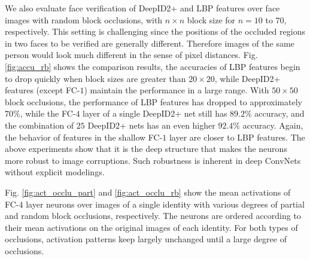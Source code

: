 \documentclass[10pt,twocolumn,letterpaper]{article}
\begin{document}
We also evaluate face verification of DeepID2+ and LBP features over face images with random block occlusions, with $n\times n$ block size for $n=10$ to $70$, respectively. This setting is challenging since the positions of the occluded regions in two faces to be verified are generally different. Therefore images of the same person would look much different in the sense of pixel distances. Fig. \ref{fig:accu_rb} shows the comparison results, the accuracies of LBP features begin to drop quickly when block sizes are greater than $20\times20$, while DeepID2+ features (except FC-$1$) maintain the performance in a large range. With $50\times50$ block occlusions, the performance of LBP features has dropped to approximately $70\%$, while the FC-$4$ layer of a single DeepID2+ net still has $89.2\%$ accuracy, and the combination of $25$ DeepID2+ nets has an even higher $92.4\%$ accuracy. Again, the behavior of features in the shallow FC-$1$ layer are closer to LBP features. The above experiments show that it is the deep structure that makes the neurons more robust to image corruptions. Such robustness is inherent in deep ConvNets without explicit modelings.

Fig. \ref{fig:act_occlu_part} and \ref{fig:act_occlu_rb} show the mean activations of FC-$4$ layer neurons over images of a single identity with various degrees of partial and random block occlusions, respectively. The neurons are ordered according to their mean activations on the original images of each identity. For both types of occlusions, activation patterns keep largely unchanged until a large degree of occlusions.
\end{document}
